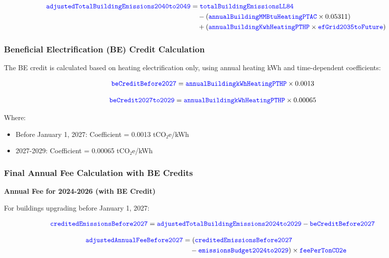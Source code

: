 \documentclass{article}
\newcommand{\code}[1]{\textcolor{blue}{\texttt{#1}}}
\begin{document}
\begin{align}
\code{adjustedTotalBuildingEmissions2040to2049} &= \code{totalBuildingEmissionsLL84} \nonumber \\
&\quad - (\code{annualBuildingMMBtuHeatingPTAC} \times 0.05311) \nonumber \\
&\quad + (\code{annualBuildingKwhHeatingPTHP} \times \code{efGrid2035toFuture})
\end{align}

\subsubsection{Beneficial Electrification (BE) Credit Calculation}

The BE credit is calculated based on heating electrification only, using annual heating kWh and time-dependent coefficients:

\begin{align}
\code{beCreditBefore2027} &= \code{annualBuildingkWhHeatingPTHP} \times 0.0013
\end{align}

\begin{align}
\code{beCredit2027to2029} &= \code{annualBuildingkWhHeatingPTHP} \times 0.00065
\end{align}

Where:
\begin{itemize}
    \item Before January 1, 2027: Coefficient = 0.0013 tCO₂e/kWh
    \item 2027-2029: Coefficient = 0.00065 tCO₂e/kWh
\end{itemize}

\subsubsection{Final Annual Fee Calculation with BE Credits}

\textbf{Annual Fee for 2024-2026 (with BE Credit)}

For buildings upgrading before January 1, 2027:

\begin{align}
\code{creditedEmissionsBefore2027} &= \code{adjustedTotalBuildingEmissions2024to2029} - \code{beCreditBefore2027}
\end{align}

\begin{align}
\code{adjustedAnnualFeeBefore2027} &= (\code{creditedEmissionsBefore2027} \nonumber\\
&\quad - \code{emissionsBudget2024to2029}) \times \code{feePerTonCO2e}
\end{align}
\end{document}
